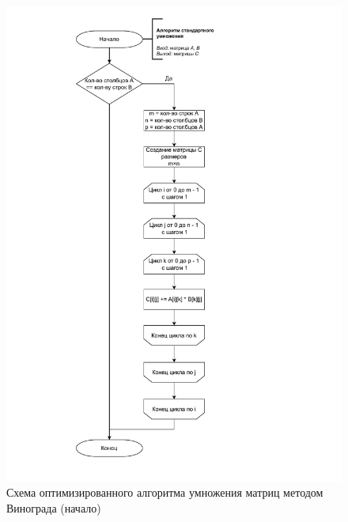 \begin{figure}[h]
	\centering
	\includegraphics[height=0.9\textheight, page=4]{img/algorithms.pdf}
	\caption{Схема оптимизированного алгоритма умножения матриц методом Винограда (начало)}
	\label{fig:VinogradOpt1}
\end{figure}

